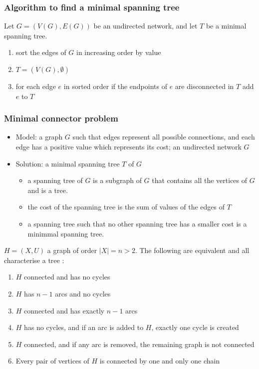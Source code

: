 \documentclass[aspectratio=43]{beamer}
\begin{document}
\begin{frame}\frametitle{Algorithm to find a minimal spanning tree}
Let $G=(V(G),E(G))$ be an undirected network, and let $T$ be a minimal spanning tree.
 
\begin{enumerate}
\item sort the edges of $G$ in increasing order by value
\item $T=(V(G),\emptyset)$
\item for each edge $e$ in sorted order
        if the endpoints of $e$ are disconnected in $T$
        add $e$ to $T$
\end{enumerate}
\end{frame}

\begin{frame}\frametitle{Minimal connector problem}
\begin{itemize}
\item Model: a graph $G$ such that edges represent all possible connections, and each edge has a positive value which represents its cost; 
an undirected network $G$
\item Solution: a  minimal spanning tree $T$ of $G$
\begin{itemize}
\item a spanning tree of $G$ is a subgraph of $G$ that contains all the vertices of $G$ and is a tree.
\item the cost of the spanning tree is the sum of values of the edges of $T$
\item a spanning tree such that no other spanning tree has a smaller cost is a minimmal spanning tree.
\end{itemize}
\end{itemize}
\end{frame}



\begin{frame}
\begin{theorem}\label{th:characterisation_tree}
$H=(X,U)$ a graph of order $|X|=n>2$. The following are equivalent and all characterise a tree :
\begin{enumerate}
\item $H$ connected and has no cycles
\item $H$ has $n-1$ arcs and no cycles
\item $H$ connected and has exactly $n-1$ arcs
\item $H$ has no cycles, and if an arc is added to $H$, exactly one cycle is created
\item $H$ connected, and if any arc is removed, the remaining graph is not
connected
\item Every pair of vertices of $H$ is connected by one and only one chain
\end{enumerate}
\end{theorem}
\end{frame}
\end{document}
